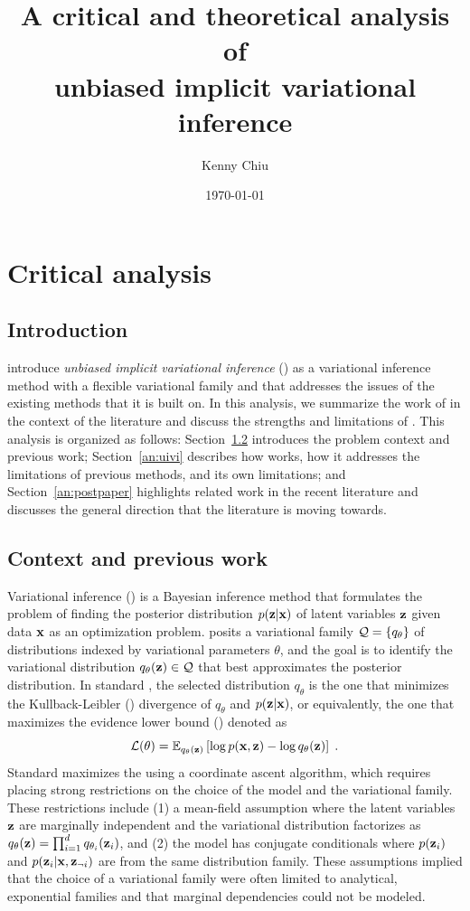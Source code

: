 \documentclass[10pt]{article}
\title{A critical and theoretical analysis of\\unbiased implicit variational inference}
\author{Kenny Chiu}
\date{\today}
\begin{document}
\maketitle


\newpage


\section{Critical analysis}

\subsection{Introduction}

\citet{Titsias:2019} introduce \textit{unbiased implicit variational inference} (\uivi) as a variational inference method with a flexible variational family and that addresses the issues of the existing methods that it is built on. In this analysis, we summarize the work of \citet{Titsias:2019} in the context of the literature and discuss the strengths and limitations of \uivi. This analysis is organized as follows: Section~\ref{an:literature} introduces the problem context and previous work; Section~\ref{an:uivi} describes how \uivi works, how it addresses the limitations of previous methods, and its own limitations; and Section~\ref{an:postpaper} highlights related work in the recent literature and discusses the general direction that the literature is moving towards.

\subsection{Context and previous work} \label{an:literature}

Variational inference (\vi) \citep{Jordan:1999} is a Bayesian inference method that formulates the problem of finding the posterior distribution $p(\mathbf{z}|\mathbf{x})$ of latent variables $\mathbf{z}$ given data $\mathbf{x}$ as an optimization problem. \vi posits a variational family $\mathcal{Q}=\{q_\theta\}$ of distributions indexed by variational parameters $\theta$, and the goal is to identify the variational distribution $q_\theta(\mathbf{z})\in\mathcal{Q}$ that best approximates the posterior distribution. In standard \vi, the selected distribution $q_\theta$ is the one that minimizes the Kullback-Leibler (\kl) divergence of $q_\theta$ and $p(\mathbf{z}|\mathbf{x})$, or equivalently, the one that maximizes the evidence lower bound (\elbo) denoted as
\[
\mathcal{L}(\theta) = \mathbb{E}_{q_\theta(\mathbf{z})}\left[\log p(\mathbf{x},\mathbf{z}) - \log q_\theta(\mathbf{z})\right] \;.
\]
Standard \vi maximizes the \elbo using a coordinate ascent algorithm, which requires placing strong restrictions on the choice of the model and the variational family. These restrictions include (1) a mean-field assumption where the latent variables $\mathbf{z}$ are marginally independent and the variational distribution factorizes as $q_\theta(\mathbf{z})=\prod_{i=1}^dq_{\theta_i}(\mathbf{z}_i)$, and (2) the model has conjugate conditionals where $p(\mathbf{z}_i)$ and $p(\mathbf{z}_i|\mathbf{x},\mathbf{z}_{\neg i})$ are from the same distribution family. These assumptions implied that the choice of a variational family were often limited to analytical, exponential families and that marginal dependencies could not be modeled.
\\
\end{document}
